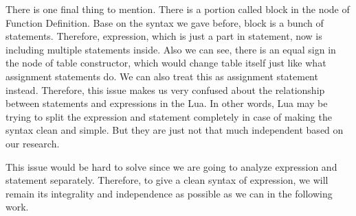 There is one final thing to mention. There is a portion called block in the node of Function Definition. Base on the syntax we gave before, block is a bunch of statements. Therefore, expression, which is just a part in statement, now is including multiple statements inside. Also we can see, there is an equal sign in the node of table constructor, which would change table itself just like what assignment statements do. We can also treat this as assignment statement instead. Therefore, this issue makes us very confused about the relationship between statements and expressions in the Lua. In other words, Lua may be trying to split the expression and statement completely in case of making the syntax clean and simple. But they are just not that much independent based on our research.

This issue would be hard to solve since we are going to analyze expression and statement separately. Therefore, to give a clean syntax of expression, we will remain its integrality and independence as possible as we can in the following work.



\newcommand{\mydefhead}[2]{\multicolumn{2}{l}{{#1}}&\mbox{\emph{#2}}\\}
\newcommand{\mydefcase}[2]{\qquad\qquad& #1 &\mbox{#2}\\}

\newcommand{\functiondef}[2]{\mbox{\tt function}~(\overline{#1_i})~#2~ {\tt end}}


